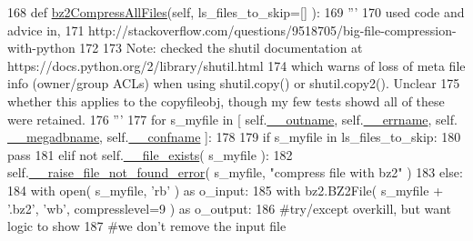 \begin{DoxyCode}
168     \textcolor{keyword}{def }\hyperlink{classnegui_1_1pgoutputsimupop_1_1PGOutputSimuPop_a3046e1eac1fbd82acf47c0f7c0d06b70}{bz2CompressAllFiles}(self, ls\_files\_to\_skip=[] ):
169         \textcolor{stringliteral}{'''}
170 \textcolor{stringliteral}{        used code and advice in, }
171 \textcolor{stringliteral}{        http://stackoverflow.com/questions/9518705/big-file-compression-with-python}
172 \textcolor{stringliteral}{}
173 \textcolor{stringliteral}{        Note: checked the shutil documentation at https://docs.python.org/2/library/shutil.html}
174 \textcolor{stringliteral}{        which warns of loss of meta file info (owner/group ACLs) when using shutil.copy() or
       shutil.copy2().  Unclear}
175 \textcolor{stringliteral}{        whether this applies to the copyfileobj, though my few tests showd all of these were retained.}
176 \textcolor{stringliteral}{        '''}
177         \textcolor{keywordflow}{for} s\_myfile \textcolor{keywordflow}{in} [ self.\hyperlink{classnegui_1_1pgoutputsimupop_1_1PGOutputSimuPop_a50f64be6bb990a0ac6898a44b4bf6fbc}{\_\_outname}, self.\hyperlink{classnegui_1_1pgoutputsimupop_1_1PGOutputSimuPop_a26363a7bbc4ae53b86585e32f0360e2a}{\_\_errname}, self.
      \hyperlink{classnegui_1_1pgoutputsimupop_1_1PGOutputSimuPop_aa89de70104807ce7e26bb17310f74b97}{\_\_megadbname}, self.\hyperlink{classnegui_1_1pgoutputsimupop_1_1PGOutputSimuPop_af5c9a72247505d2c2bb3d7400cbc09b3}{\_\_confname} ]:
178             
179             \textcolor{keywordflow}{if} s\_myfile \textcolor{keywordflow}{in} ls\_files\_to\_skip:
180                 \textcolor{keywordflow}{pass}
181             \textcolor{keywordflow}{elif} \textcolor{keywordflow}{not} self.\hyperlink{classnegui_1_1pgoutputsimupop_1_1PGOutputSimuPop_a1fdfb988619bd4a9d377a1e20f52839c}{\_\_file\_exists}( s\_myfile ):
182                 self.\hyperlink{classnegui_1_1pgoutputsimupop_1_1PGOutputSimuPop_abf6aab4f7982c2b0f9e4544343bf241b}{\_\_raise\_file\_not\_found\_error}( s\_myfile, \textcolor{stringliteral}{"compress file
       with bz2"}  )
183             \textcolor{keywordflow}{else}:
184                 with open( s\_myfile, \textcolor{stringliteral}{'rb'} ) \textcolor{keyword}{as} o\_input:
185                     with bz2.BZ2File( s\_myfile + \textcolor{stringliteral}{'.bz2'}, \textcolor{stringliteral}{'wb'}, compresslevel=9 ) \textcolor{keyword}{as} o\_output:
186                         \textcolor{comment}{#try/except overkill, but want logic to show}
187                         \textcolor{comment}{#we don't remove the input file}

\end{DoxyCode}
